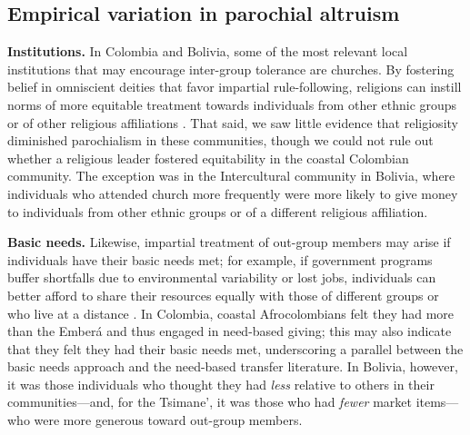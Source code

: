 \documentclass[bibauthoryear]{aa}
\begin{document}
\subsection{Empirical variation in parochial altruism}

\textbf{Institutions.} In Colombia and Bolivia, some of the most relevant local institutions that may encourage inter-group tolerance are churches. By fostering belief in omniscient deities that favor impartial rule-following, religions can instill norms of more equitable treatment towards individuals from other ethnic groups or of other religious affiliations \citep{purzycki2018evolution, lang2019moralizing}. That said, we saw little evidence that religiosity diminished parochialism in these communities, though we could not rule out whether a religious leader fostered equitability in the coastal Colombian community. The exception was in the Intercultural community in Bolivia, where individuals who attended church more frequently were more likely to give money to individuals from other ethnic groups or of a different religious affiliation.

\textbf{Basic needs.} Likewise, impartial treatment of out-group members may arise if individuals have their basic needs met; for example, if government programs buffer shortfalls due to environmental variability or lost jobs, individuals can better afford to share their resources equally with those of different groups or who live at a distance \citep{hruschka2014impartial, silva2014cooperation}. In Colombia, coastal Afrocolombians felt they had more than the Ember\'a and thus engaged in need-based giving; this may also indicate that they felt they had their basic needs met, underscoring a parallel between the basic needs approach and the need-based transfer literature. In Bolivia, however, it was those individuals who thought they had \emph{less} relative to others in their communities---and, for the Tsimane', it was those who had \emph{fewer} market items---who were more generous toward out-group members.
\end{document}
